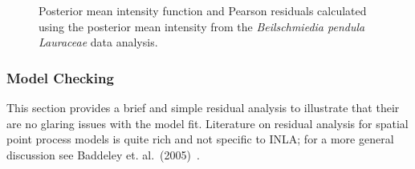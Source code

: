 \documentclass[]{interact}
\begin{document}
\begin{figure}[p]



\caption{Posterior mean intensity function and Pearson residuals calculated
using the posterior mean intensity from the \emph{Beilschmiedia pendula
Lauraceae} data analysis.}
\label{beiintensity}
\end{figure}

\subsubsection{Model Checking}
\label{beiresid}

This section provides a brief and simple residual analysis to illustrate that
their are no glaring issues with the model fit. Literature on residual analysis
for spatial point process models is quite rich and not specific to INLA; for a
more general discussion see Baddeley et. al.~(2005)~\cite{baddeleyresiduals}.
\end{document}
